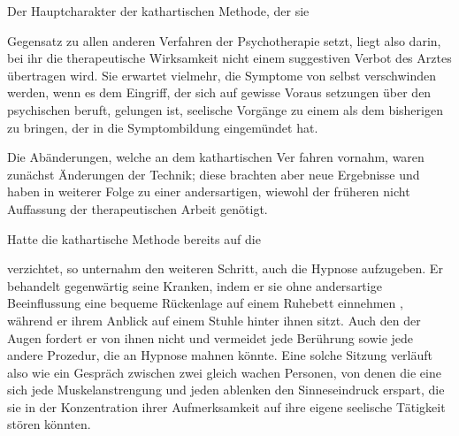 \documentclass[twoside=true,titlepage=false,open=any, parskip=never, fontsize=10pt, headings=small, chapterprefix=false, appendixprefix=false]{scrbook}
\begin{document}
        \pstart
        Der Hauptcharakter der kathartischen Methode, der sie 

 Gegensatz zu allen anderen Verfahren der Psychotherapie setzt,
 liegt
               also darin,  bei ihr die therapeutische Wirksamkeit
 nicht einem suggestiven Verbot des
               Arztes übertragen wird. Sie
 erwartet vielmehr,  die Symptome von selbst verschwinden
 werden, wenn es dem Eingriff, der
               sich auf gewisse Voraus
setzungen über den psychischen  beruft, gelungen
 ist, seelische Vorgänge zu einem  als dem bisherigen  zu bringen, der in die Symptombildung eingemündet hat.
        \pend
    

        \pstart
        Die Abänderungen, welche  an dem kathartischen
                  Ver
fahren  vornahm, waren zunächst Änderungen der
 Technik; diese brachten
               aber neue Ergebnisse und haben in
 weiterer Folge zu einer andersartigen, wiewohl
               der früheren
 nicht  Auffassung der therapeutischen Arbeit
 genötigt.
        \pend
    

        \pstart
        Hatte die kathartische Methode bereits auf die 

 verzichtet, so unternahm  den weiteren Schritt, auch die
 Hypnose aufzugeben. Er behandelt
                  gegenwärtig seine Kranken, 
indem er sie ohne andersartige Beeinflussung eine bequeme
 Rückenlage auf
               einem Ruhebett einnehmen , während er
 ihrem Anblick  auf einem Stuhle hinter ihnen
 sitzt. Auch den  der Augen fordert er von ihnen nicht
 und vermeidet jede Berührung sowie
               jede andere Prozedur, die
 an Hypnose mahnen könnte. Eine solche Sitzung verläuft
               also
 wie ein Gespräch zwischen zwei gleich wachen Personen, von
 denen die
               eine sich jede Muskelanstrengung und jeden ablenken
den Sinneseindruck
               erspart, die sie in der Konzentration ihrer
 Aufmerksamkeit auf ihre eigene
               seelische Tätigkeit stören könnten.
        \pend
    
\end{document}

